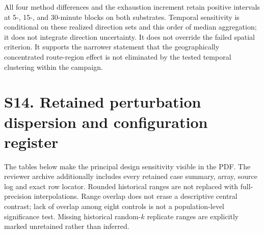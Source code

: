 \documentclass[journal,onecolumn,10pt]{IEEEtran}
\begin{document}
All four method differences and the exhaustion increment retain positive intervals at 5-, 15-, and 30-minute blocks on both substrates. Temporal sensitivity is conditional on these realized direction sets and this order of median aggregation; it does not integrate direction uncertainty. It does not override the failed spatial criterion. It supports the narrower statement that the geographically concentrated route-region effect is not eliminated by the tested temporal clustering within the campaign.


\section*{S14. Retained perturbation dispersion and configuration register}
The tables below make the principal design sensitivity visible in the PDF. The reviewer archive additionally includes every retained case summary, array, source log and exact row locator. Rounded historical ranges are not replaced with full-precision interpolations. Range overlap does not erase a descriptive central contrast; lack of overlap among eight controls is not a population-level significance test. Missing historical random-$k$ replicate ranges are explicitly marked unretained rather than inferred.
\end{document}
